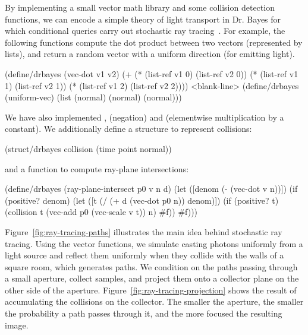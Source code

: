 By implementing a small vector math library and some collision detection functions, we can encode a simple theory of light transport in Dr. Bayes for which conditional queries carry out stochastic ray tracing~\cite{cit:veach-1997siggraph-mlt}.
For example, the following functions compute the dot product between two vectors (represented by lists), and return a random vector with a uniform direction (for emitting light).
\begin{center}\singlespacing
\begin{schemedisplay}
(define/drbayes (vec-dot v1 v2)
  (+ (* (list-ref v1 0) (list-ref v2 0))
     (* (list-ref v1 1) (list-ref v2 1))
     (* (list-ref v1 2) (list-ref v2 2))))
<blank-line>
(define/drbayes (uniform-vec)
  (list (normal) (normal) (normal)))
\end{schemedisplay}
\end{center}
We have also implemented ,  (negation) and  (elementwise multiplication by a constant).
We additionally define a structure to represent collisions:
\begin{center}\singlespacing
\begin{schemedisplay}
(struct/drbayes collision (time point normal))
\end{schemedisplay}
\end{center}
and a function to compute ray-plane intersections:
\begin{center}\singlespacing
\begin{schemedisplay}
(define/drbayes (ray-plane-intersect p0 v n d)
  (let ([denom  (- (vec-dot v n))])
    (if (positive? denom)
        (let ([t  (/ (+ d (vec-dot p0 n)) denom)])
          (if (positive? t) (collision t (vec-add p0 (vec-scale v t)) n) #f))
        #f)))
\end{schemedisplay}
\end{center}

Figure~\ref{fig:ray-tracing-paths} illustrates the main idea behind stochastic ray tracing.
Using the vector functions, we simulate casting photons uniformly from a light source and reflect them uniformly when they collide with the walls of a square room, which generates paths.
We condition on the paths passing through a small aperture, collect samples, and project them onto a collector plane on the other side of the aperture.
Figure~\ref{fig:ray-tracing-projection} shows the result of accumulating the collisions on the collector.
The smaller the aperture, the smaller the probability a path passes through it, and the more focused the resulting image.

